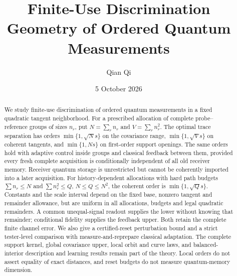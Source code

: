 \documentclass[11pt]{amsart}
\title[Finite-use discrimination geometry]{Finite-Use Discrimination Geometry of Ordered Quantum Measurements}
\author{Qian Qi}
\date{5 October 2026}
\numberwithin{equation}{section}
\theoremstyle{definition}\newtheorem{definition}[theorem]{Definition}
\theoremstyle{remark}\newtheorem{remark}[theorem]{Remark}
\begin{document}
\raggedbottom
\begin{abstract}
We study finite-use discrimination of ordered quantum measurements
in a fixed quadratic tangent neighborhood.  For a prescribed
allocation of complete probe--reference groups of sizes $n_r$, put
$N=\sum_r n_r$ and $V=\sum_r n_r^2$.  The optimal trace separation
has orders $\min\{1,\sqrt N s\}$ on the covariance range,
$\min\{1,\sqrt V s\}$ on coherent tangents, and $\min\{1,Ns\}$
on first-order support openings.  The same orders hold with
adaptive control inside groups and classical feedback between them,
provided every fresh complete acquisition is conditionally independent
of all old receiver memory.  Receiver quantum storage is unrestricted
but cannot be coherently imported into a later acquisition.
For history-dependent allocations with hard path budgets
$\sum n_r\le N$ and $\sum n_r^2\le Q$, $N\le Q\le N^2$,
the coherent order is $\min\{1,\sqrt Q s\}$.
Constants and the scale interval depend on the fixed base, nonzero
tangent and remainder allowance, but are uniform in all allocations,
budgets and legal quadratic remainders.  A common unequal-signal
readout supplies the lower without knowing that remainder;
conditional fidelity supplies the feedback upper.  Both retain the
complete finite channel error.  We also give a certified-reset
perturbation bound and a strict tester-level comparison with
measure-and-reprepare classical adaptation.  The complete support
kernel, global covariance upper, local orbit and curve laws, and
balanced-interior description and learning results remain part of
the theory.  Local orders do not assert equality of exact distances,
and reset budgets do not measure quantum-memory dimension.
\end{abstract}
\maketitle




















\end{document}
